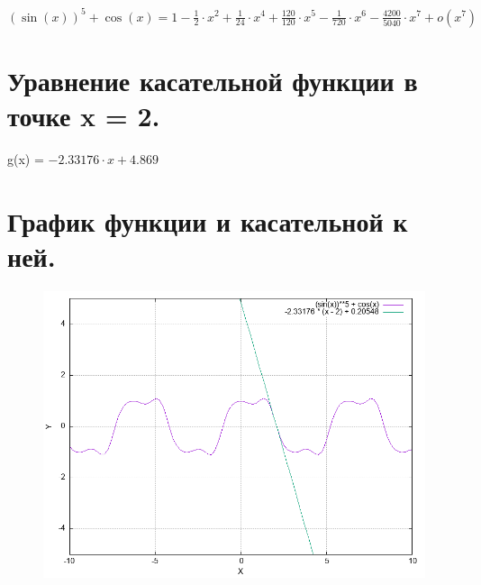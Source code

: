 \documentclass{article}
\begin{document}
${(\sin(x))}^{5} + \cos(x) =  1 - \frac{1}{2}\cdot x^2 + \frac{1}{24}\cdot x^4 + \frac{120}{120}\cdot x^5 - \frac{1}{720}\cdot x^6 - \frac{4200}{5040}\cdot x^7 + o(x^7) $
\section{Уравнение касательной функции в точке x = 2.}

g(x) = $-2.33176 \cdot x + 4.869 $
\section{График функции и касательной к ней.}


\begin{figure}[ht]
\center
\includegraphics[scale=0.65]{graph.png}
\end{figure}
\end{document}
